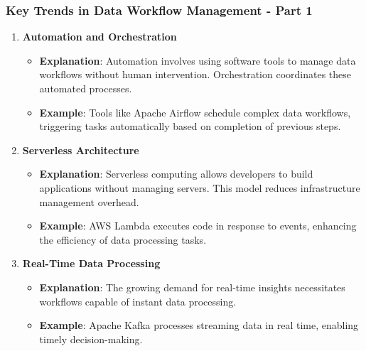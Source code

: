 \documentclass[aspectratio=169]{beamer}
\begin{document}
\begin{frame}[fragile]
    \frametitle{Key Trends in Data Workflow Management - Part 1}
    \begin{enumerate}
        \item \textbf{Automation and Orchestration}
        \begin{itemize}
            \item \textbf{Explanation}: Automation involves using software tools to manage data workflows without human intervention. Orchestration coordinates these automated processes.
            \item \textbf{Example}: Tools like Apache Airflow schedule complex data workflows, triggering tasks automatically based on completion of previous steps.
        \end{itemize}

        \item \textbf{Serverless Architecture}
        \begin{itemize}
            \item \textbf{Explanation}: Serverless computing allows developers to build applications without managing servers. This model reduces infrastructure management overhead.
            \item \textbf{Example}: AWS Lambda executes code in response to events, enhancing the efficiency of data processing tasks.
        \end{itemize}
        
        \item \textbf{Real-Time Data Processing}
        \begin{itemize}
            \item \textbf{Explanation}: The growing demand for real-time insights necessitates workflows capable of instant data processing. 
            \item \textbf{Example}: Apache Kafka processes streaming data in real time, enabling timely decision-making.
        \end{itemize}
    \end{enumerate}
\end{frame}
\end{document}
